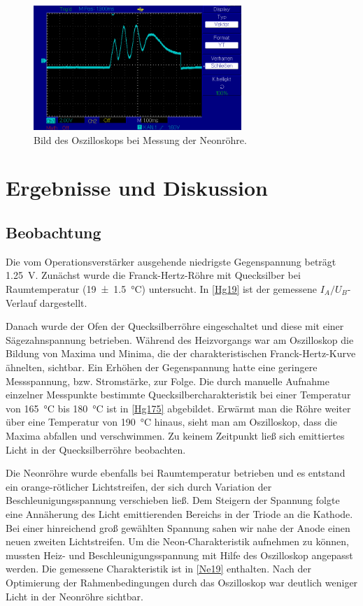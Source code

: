 \documentclass[
	a4paper,
	12pt,
	pagesize,
	ngerman
]{scrartcl}
\begin{document}
	\begin{figure}[H]
		\includegraphics[width=0.7\textwidth]{oszi}
		\centering
		\caption{Bild des Oszilloskops bei Messung der Neonröhre.}
		\label{oszi}
		\centering
	\end{figure}

	\section{Ergebnisse und Diskussion}
	

	\subsection{Beobachtung}
	Die vom Operationsverstärker ausgehende niedrigste Gegenspannung beträgt \SI{1,25}{V}. Zunächst wurde die Franck-Hertz-Röhre mit Quecksilber bei Raumtemperatur (\SI{19 +- 1,5}{\degreeCelsius}) untersucht. In \cref{Hg19} ist der gemessene $I_A/U_B$-Verlauf dargestellt.
	
	Danach wurde der Ofen der Quecksilberröhre eingeschaltet und diese mit einer Sägezahnspannung betrieben. %
	Während des Heizvorgangs war am Oszilloskop die Bildung von Maxima und Minima, die der charakteristischen Franck-Hertz-Kurve ähnelten, sichtbar. %
	Ein Erhöhen der Gegenspannung hatte eine geringere Messspannung, bzw. Stromstärke, zur Folge.
	Die durch manuelle Aufnahme einzelner Messpunkte bestimmte Quecksilbercharakteristik bei einer Temperatur von \SI{165}{\degreeCelsius} bis \SI{180}{\degreeCelsius} ist in \cref{Hg175} abgebildet.
	Erwärmt man die Röhre weiter über eine Temperatur von \SI{190}{\degreeCelsius} hinaus, sieht man am Oszilloskop, dass die Maxima abfallen und verschwimmen.
	Zu keinem Zeitpunkt ließ sich emittiertes Licht in der Quecksilberröhre beobachten.
	
	Die Neonröhre wurde ebenfalls bei Raumtemperatur betrieben und es entstand ein orange-rötlicher Lichtstreifen, der sich durch Variation der Beschleunigungsspannung verschieben ließ. 
	Dem Steigern der Spannung folgte eine Annäherung des Licht emittierenden Bereichs in der Triode an die Kathode.
	Bei einer hinreichend groß gewählten Spannung sahen wir nahe der Anode einen neuen zweiten Lichtstreifen.
	Um die Neon-Charakteristik aufnehmen zu können, mussten Heiz- und Beschleunigungsspannung mit Hilfe des Oszilloskop angepasst werden.
	Die gemessene Charakteristik ist in \cref{Ne19} enthalten. Nach der Optimierung der Rahmenbedingungen durch das Oszilloskop war deutlich weniger Licht in der Neonröhre sichtbar.
	
\end{document}
